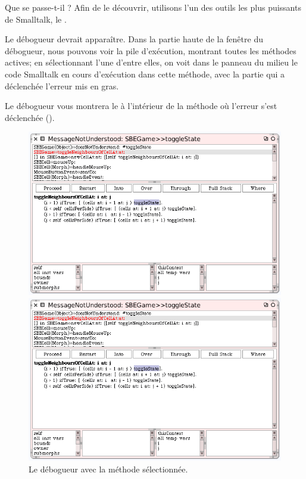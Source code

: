 \documentclass[a4paper,10pt,twoside]{book}
\begin{document}
\noindent
Que se passe-t-il ? Afin de le découvrir, utilisons l'un des outils les plus puissants de Smalltalk, le .

Le débogueur devrait apparaître.
Dans la partie haute de la fenêtre du débogueur, nous pouvons voir la pile d'exécution, montrant toutes les méthodes actives; en sélectionnant l'une d'entre elles, on voit dans le panneau du milieu le code Smalltalk en cours d'exécution dans cette méthode, avec la partie qui a déclenchée l'erreur mis en gras.

Le débogueur vous montrera le  à l'intérieur de la méthode où l'erreur s'est déclenchée ().

\begin{figure}[ht]
\ifluluelse
	{\centerline {\includegraphics[width=\textwidth]{Debugger}}}
	{\centerline {\includegraphics[scale=0.7]{Debugger}}}
\caption{Le débogueur avec la méthode  sélectionnée.
\label{fig:debugToggle}}
\end{figure}
\end{document}
